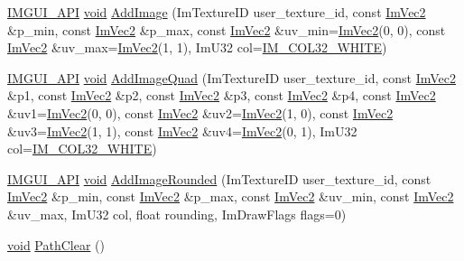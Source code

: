 \begin{DoxyCompactItemize}
\item 
\hyperlink{imgui_8h_a43829975e84e45d1149597467a14bbf5}{I\+M\+G\+U\+I\+\_\+\+A\+PI} \hyperlink{imgui__impl__opengl3__loader_8h_ac668e7cffd9e2e9cfee428b9b2f34fa7}{void} \hyperlink{structImDrawList_ac1f529d53d7ba118484e47e49218c603}{Add\+Image} (Im\+Texture\+ID user\+\_\+texture\+\_\+id, const \hyperlink{structImVec2}{Im\+Vec2} \&p\+\_\+min, const \hyperlink{structImVec2}{Im\+Vec2} \&p\+\_\+max, const \hyperlink{structImVec2}{Im\+Vec2} \&uv\+\_\+min=\hyperlink{structImVec2}{Im\+Vec2}(0, 0), const \hyperlink{structImVec2}{Im\+Vec2} \&uv\+\_\+max=\hyperlink{structImVec2}{Im\+Vec2}(1, 1), Im\+U32 col=\hyperlink{imgui_8h_a08fc9855cd3e3fcbb7fcd93b38bd7057}{I\+M\+\_\+\+C\+O\+L32\+\_\+\+W\+H\+I\+TE})
\item 
\hyperlink{imgui_8h_a43829975e84e45d1149597467a14bbf5}{I\+M\+G\+U\+I\+\_\+\+A\+PI} \hyperlink{imgui__impl__opengl3__loader_8h_ac668e7cffd9e2e9cfee428b9b2f34fa7}{void} \hyperlink{structImDrawList_abf9199e08d17fd33736fd67598485341}{Add\+Image\+Quad} (Im\+Texture\+ID user\+\_\+texture\+\_\+id, const \hyperlink{structImVec2}{Im\+Vec2} \&p1, const \hyperlink{structImVec2}{Im\+Vec2} \&p2, const \hyperlink{structImVec2}{Im\+Vec2} \&p3, const \hyperlink{structImVec2}{Im\+Vec2} \&p4, const \hyperlink{structImVec2}{Im\+Vec2} \&uv1=\hyperlink{structImVec2}{Im\+Vec2}(0, 0), const \hyperlink{structImVec2}{Im\+Vec2} \&uv2=\hyperlink{structImVec2}{Im\+Vec2}(1, 0), const \hyperlink{structImVec2}{Im\+Vec2} \&uv3=\hyperlink{structImVec2}{Im\+Vec2}(1, 1), const \hyperlink{structImVec2}{Im\+Vec2} \&uv4=\hyperlink{structImVec2}{Im\+Vec2}(0, 1), Im\+U32 col=\hyperlink{imgui_8h_a08fc9855cd3e3fcbb7fcd93b38bd7057}{I\+M\+\_\+\+C\+O\+L32\+\_\+\+W\+H\+I\+TE})
\item 
\hyperlink{imgui_8h_a43829975e84e45d1149597467a14bbf5}{I\+M\+G\+U\+I\+\_\+\+A\+PI} \hyperlink{imgui__impl__opengl3__loader_8h_ac668e7cffd9e2e9cfee428b9b2f34fa7}{void} \hyperlink{structImDrawList_a864ccce7a012e9c1ffb4d5693311d847}{Add\+Image\+Rounded} (Im\+Texture\+ID user\+\_\+texture\+\_\+id, const \hyperlink{structImVec2}{Im\+Vec2} \&p\+\_\+min, const \hyperlink{structImVec2}{Im\+Vec2} \&p\+\_\+max, const \hyperlink{structImVec2}{Im\+Vec2} \&uv\+\_\+min, const \hyperlink{structImVec2}{Im\+Vec2} \&uv\+\_\+max, Im\+U32 col, float rounding, Im\+Draw\+Flags flags=0)
\item 
\hyperlink{imgui__impl__opengl3__loader_8h_ac668e7cffd9e2e9cfee428b9b2f34fa7}{void} \hyperlink{structImDrawList_ae9ad5f4d638b1bfd9383618dc60e3f18}{Path\+Clear} ()
\item 

\end{DoxyCompactItemize}
